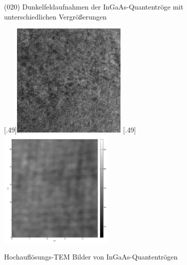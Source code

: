\documentclass[a4paper,11pt,DIV=11]{scrartcl}
\begin{document}
\begin{figure}[htb]
	\caption{(020) Dunkelfeldaufnahmen der InGaAs-Quantentröge mit unterschiedlichen Vergrößerungen} \label{trogdunkel}
\end{figure}

\begin{figure}[htb]\centering
	[.49\linewidth]{\includegraphics[width=0.49\textwidth]{Versuchsdaten/13/good_data/Frame3.jpg}}
	[.49\linewidth]{\includegraphics[width=0.49\textwidth]{Versuchsdaten/13/good_data/Frame3_rotated_and_filtered.jpg}}\\
	\caption{Hochauflösungs-TEM Bilder von InGaAs-Quantentrögen} \label{hoch}
\end{figure}
\end{document}
